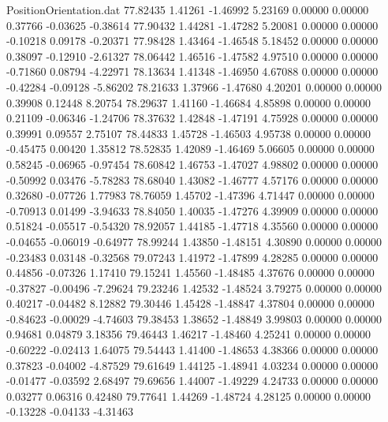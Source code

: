 \begin{filecontents}{PositionOrientation.dat}
  77.82435    1.41261   -1.46992     5.23169    0.00000    0.00000    0.37766   -0.03625   -0.38614
  77.90432    1.44281   -1.47282     5.20081    0.00000    0.00000   -0.10218    0.09178   -0.20371
  77.98428    1.43464   -1.46548     5.18452    0.00000    0.00000    0.38097   -0.12910   -2.61327
  78.06442    1.46516   -1.47582     4.97510    0.00000    0.00000   -0.71860    0.08794   -4.22971
  78.13634    1.41348   -1.46950     4.67088    0.00000    0.00000   -0.42284   -0.09128   -5.86202
  78.21633    1.37966   -1.47680     4.20201    0.00000    0.00000    0.39908    0.12448    8.20754
  78.29637    1.41160   -1.46684     4.85898    0.00000    0.00000    0.21109   -0.06346   -1.24706
  78.37632    1.42848   -1.47191     4.75928    0.00000    0.00000    0.39991    0.09557    2.75107
  78.44833    1.45728   -1.46503     4.95738    0.00000    0.00000   -0.45475    0.00420    1.35812
  78.52835    1.42089   -1.46469     5.06605    0.00000    0.00000    0.58245   -0.06965   -0.97454
  78.60842    1.46753   -1.47027     4.98802    0.00000    0.00000   -0.50992    0.03476   -5.78283
  78.68040    1.43082   -1.46777     4.57176    0.00000    0.00000    0.32680   -0.07726    1.77983
  78.76059    1.45702   -1.47396     4.71447    0.00000    0.00000   -0.70913    0.01499   -3.94633
  78.84050    1.40035   -1.47276     4.39909    0.00000    0.00000    0.51824   -0.05517   -0.54320
  78.92057    1.44185   -1.47718     4.35560    0.00000    0.00000   -0.04655   -0.06019   -0.64977
  78.99244    1.43850   -1.48151     4.30890    0.00000    0.00000   -0.23483    0.03148   -0.32568
  79.07243    1.41972   -1.47899     4.28285    0.00000    0.00000    0.44856   -0.07326    1.17410
  79.15241    1.45560   -1.48485     4.37676    0.00000    0.00000   -0.37827   -0.00496   -7.29624
  79.23246    1.42532   -1.48524     3.79275    0.00000    0.00000    0.40217   -0.04482    8.12882
  79.30446    1.45428   -1.48847     4.37804    0.00000    0.00000   -0.84623   -0.00029   -4.74603
  79.38453    1.38652   -1.48849     3.99803    0.00000    0.00000    0.94681    0.04879    3.18356
  79.46443    1.46217   -1.48460     4.25241    0.00000    0.00000   -0.60222   -0.02413    1.64075
  79.54443    1.41400   -1.48653     4.38366    0.00000    0.00000    0.37823   -0.04002   -4.87529
  79.61649    1.44125   -1.48941     4.03234    0.00000    0.00000   -0.01477   -0.03592    2.68497
  79.69656    1.44007   -1.49229     4.24733    0.00000    0.00000    0.03277    0.06316    0.42480
  79.77641    1.44269   -1.48724     4.28125    0.00000    0.00000   -0.13228   -0.04133   -4.31463

\end{filecontents}
